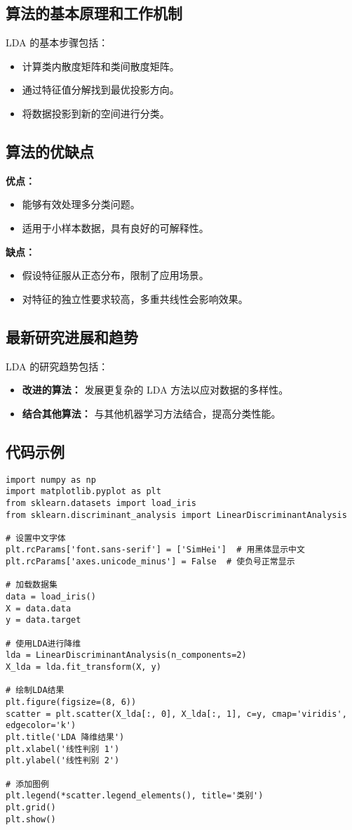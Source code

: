 \subsection*{算法的基本原理和工作机制}
LDA 的基本步骤包括：
\begin{itemize}
    \item 计算类内散度矩阵和类间散度矩阵。
    \item 通过特征值分解找到最优投影方向。
    \item 将数据投影到新的空间进行分类。
\end{itemize}

\subsection*{算法的优缺点}
\textbf{优点：}
\begin{itemize}
    \item 能够有效处理多分类问题。
    \item 适用于小样本数据，具有良好的可解释性。
\end{itemize}

\textbf{缺点：}
\begin{itemize}
    \item 假设特征服从正态分布，限制了应用场景。
    \item 对特征的独立性要求较高，多重共线性会影响效果。
\end{itemize}

\subsection*{最新研究进展和趋势}
LDA 的研究趋势包括：
\begin{itemize}
    \item \textbf{改进的算法：} 发展更复杂的 LDA 方法以应对数据的多样性。
    \item \textbf{结合其他算法：} 与其他机器学习方法结合，提高分类性能。
\end{itemize}
\subsection*{代码示例}
\begin{lstlisting}
import numpy as np
import matplotlib.pyplot as plt
from sklearn.datasets import load_iris
from sklearn.discriminant_analysis import LinearDiscriminantAnalysis

# 设置中文字体
plt.rcParams['font.sans-serif'] = ['SimHei']  # 用黑体显示中文
plt.rcParams['axes.unicode_minus'] = False  # 使负号正常显示

# 加载数据集
data = load_iris()
X = data.data
y = data.target

# 使用LDA进行降维
lda = LinearDiscriminantAnalysis(n_components=2)
X_lda = lda.fit_transform(X, y)

# 绘制LDA结果
plt.figure(figsize=(8, 6))
scatter = plt.scatter(X_lda[:, 0], X_lda[:, 1], c=y, cmap='viridis', edgecolor='k')
plt.title('LDA 降维结果')
plt.xlabel('线性判别 1')
plt.ylabel('线性判别 2')

# 添加图例
plt.legend(*scatter.legend_elements(), title='类别')
plt.grid()
plt.show()

\end{lstlisting}


